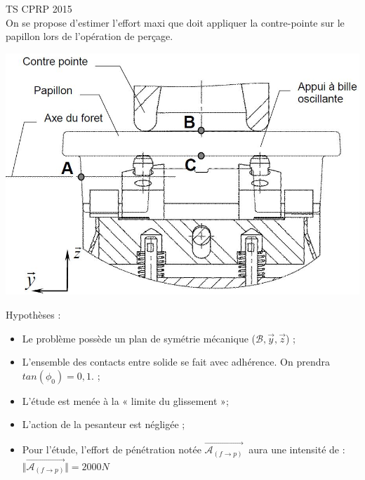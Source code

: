 \documentclass[
	11pt, %
	fleqn, %
	a4paper, %
]{LegrandOrangeBook}
\begin{document}
\begin{Extrait}
TS CPRP 2015 \\
On se propose d’estimer l’effort maxi que doit appliquer la contre-pointe sur le papillon lors de l’opération de perçage. \\



\noindent \begin{minipage}{0.5\textwidth}
\vspace{1cm}
\includegraphics[width=1\textwidth]{Images/2015.JPG}
\label{fig:nature}
\end{minipage}
\hspace{0.05\textwidth}
\begin{minipage}{0.4\textwidth}
Hypothèses : 
\begin{itemize}
\item Le problème possède un plan de
symétrie mécanique ($\mathcal{B}, \Vec{y}, \Vec{z}$) ;
\item L’ensemble des contacts entre
solide se fait avec adhérence. On
prendra $tan(\phi_{0}) = 0,1.$ ;
\item L’étude est menée à la « limite du
glissement »;
\item L'action de la pesanteur est
négligée ;
\item Pour l’étude, l’effort de pénétration notée $\overrightarrow{\mathcal{A}_{(f\rightarrow p)}}\ $ aura une intensité de : \\ $ \Vert \overrightarrow{\mathcal{A}_{(f\rightarrow p)}} \Vert = 2000 N\ $
\end{itemize}

\end{minipage}



\end{Extrait}
\end{document}
